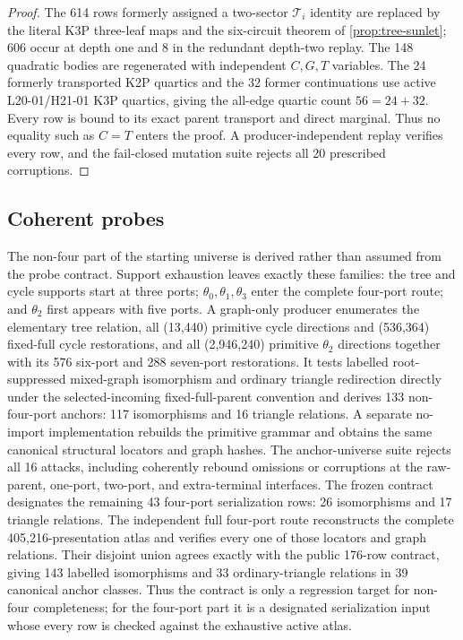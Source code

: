 \begin{proof}
The 614 rows formerly assigned a two-sector \(\mathcal T_i\) identity are
replaced by the literal K3P three-leaf maps and the six-circuit theorem of
\cref{prop:tree-sunlet}; 606 occur at depth one and 8 in the redundant
depth-two replay.  The 148 quadratic bodies are regenerated with
independent \(C,G,T\) variables.  The 24 formerly transported K2P
quartics and the 32 former continuations use active L20-01/H21-01 K3P
quartics, giving the all-edge quartic count \(56=24+32\).  Every row is bound
to its exact parent transport and direct
marginal.  Thus no equality such as \(C=T\) enters the proof.  A
producer-independent replay verifies every row, and the fail-closed mutation
suite rejects all 20 prescribed corruptions.
\end{proof}

\subsection{Coherent probes}

The non-four part of the starting universe is derived rather than assumed from
the probe contract.  Support exhaustion leaves exactly these families: the
tree and cycle supports start at three ports; \(\theta_0,\theta_1,\theta_3\)
enter the complete four-port route; and \(\theta_2\) first appears with five
ports.  A graph-only producer enumerates the elementary tree relation,
all (13{,}440) primitive cycle directions and (536{,}364) fixed-full
cycle restorations, and all (2{,}946{,}240) primitive \(\theta_2\)
directions together with its 576 six-port and 288 seven-port restorations.
It tests labelled root-suppressed mixed-graph isomorphism and ordinary
triangle redirection directly under the selected-incoming fixed-full-parent
convention and derives 133 non-four-port anchors: 117 isomorphisms and 16
triangle relations.  A separate no-import implementation rebuilds the
primitive grammar and obtains the same canonical structural locators and graph
hashes.  The anchor-universe suite rejects all 16 attacks, including
coherently rebound omissions or corruptions at the raw-parent, one-port,
two-port, and extra-terminal interfaces.
The frozen contract designates the remaining 43 four-port serialization rows: 26
isomorphisms and 17 triangle relations.  The independent full four-port route
reconstructs the complete 405,216-presentation atlas and verifies every one of
those locators and graph relations.  Their disjoint union agrees exactly with
the public 176-row contract, giving 143 labelled isomorphisms and 33
ordinary-triangle relations in 39 canonical anchor classes.  Thus the contract
is only a regression target for non-four completeness; for the four-port part
it is a designated serialization input whose every row is checked against the
exhaustive active atlas.

